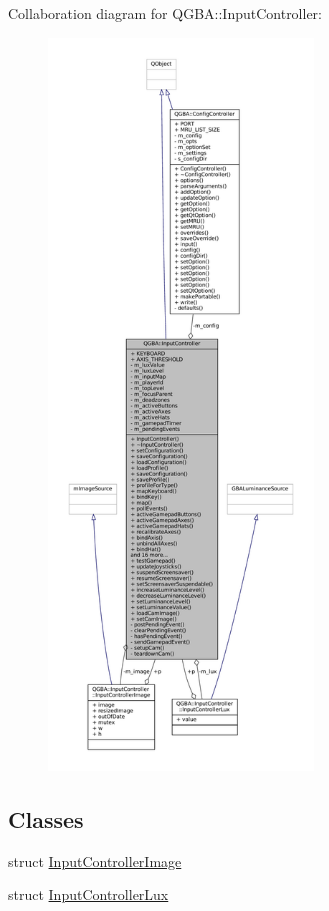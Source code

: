 Collaboration diagram for Q\+G\+BA\+:\+:Input\+Controller\+:
\nopagebreak
\begin{figure}[H]
\begin{center}
\leavevmode
\includegraphics[height=550pt]{class_q_g_b_a_1_1_input_controller__coll__graph}
\end{center}
\end{figure}
\subsection*{Classes}
\begin{DoxyCompactItemize}
\item 
struct \mbox{\hyperlink{struct_q_g_b_a_1_1_input_controller_1_1_input_controller_image}{Input\+Controller\+Image}}
\item 
struct \mbox{\hyperlink{struct_q_g_b_a_1_1_input_controller_1_1_input_controller_lux}{Input\+Controller\+Lux}}
\end{DoxyCompactItemize}
